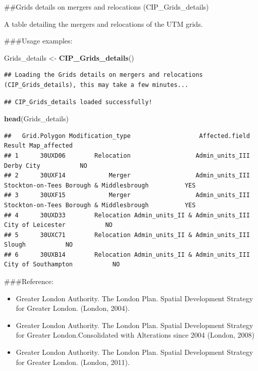 \documentclass[
]{article}
\newenvironment{Shaded}{\begin{snugshade}}{\end{snugshade}}
\newcommand{\FunctionTok}[1]{\textcolor[rgb]{0.13,0.29,0.53}{\textbf{#1}}}
\newcommand{\NormalTok}[1]{#1}
\newcommand{\OtherTok}[1]{\textcolor[rgb]{0.56,0.35,0.01}{#1}}
\providecommand{\tightlist}{%
  \setlength{\itemsep}{0pt}\setlength{\parskip}{0pt}}
\begin{document}
\#\#Grids details on mergers and relocations (CIP\_Grids\_details)

A table detailing the mergers and relocations of the UTM grids.

\#\#\#Usage examples:

\begin{Shaded}
\begin{Highlighting}[]
\NormalTok{Grids\_details }\OtherTok{\textless{}{-}} \FunctionTok{CIP\_Grids\_details}\NormalTok{()}
\end{Highlighting}
\end{Shaded}

\begin{verbatim}
## Loading the Grids details on mergers and relocations (CIP_Grids_details), this may take a few minutes...
\end{verbatim}

\begin{verbatim}
## CIP_Grids_details loaded successfully!
\end{verbatim}

\begin{Shaded}
\begin{Highlighting}[]
\FunctionTok{head}\NormalTok{(Grids\_details)}
\end{Highlighting}
\end{Shaded}

\begin{verbatim}
##   Grid.Polygon Modification_type                   Affected.field                                    Result Map_affected
## 1      30UXD06        Relocation                  Admin_units_III                                Derby City           NO
## 2      30UXF14            Merger                  Admin_units_III  Stockton-on-Tees Borough & Middlesbrough          YES
## 3      30UXF15            Merger                  Admin_units_III  Stockton-on-Tees Borough & Middlesbrough          YES
## 4      30UXD33        Relocation Admin_units_II & Admin_units_III                         City of Leicester           NO
## 5      30UXC71        Relocation Admin_units_II & Admin_units_III                                    Slough           NO
## 6      30UXB14        Relocation Admin_units_II & Admin_units_III                       City of Southampton           NO
\end{verbatim}

\#\#\#Reference:

\begin{itemize}
\tightlist
\item
  Greater London Authority. The London Plan. Spatial Development
  Strategy for Greater London. (London, 2004).
\item
  Greater London Authority. The London Plan. Spatial Development
  Strategy for Greater London.Consolidated with Alterations since 2004
  (London, 2008)
\item
  Greater London Authority. The London Plan. Spatial Development
  Strategy for Greater London. (London, 2011).
\end{itemize}
\end{document}
